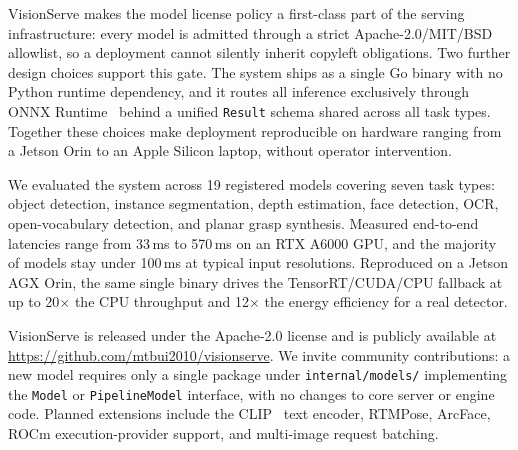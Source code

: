 VisionServe makes the model license policy a first-class part of the serving
infrastructure: every model is admitted through a strict Apache-2.0/MIT/BSD allowlist,
so a deployment cannot silently inherit copyleft obligations. Two further design choices
support this gate. The system ships as a single Go binary with no Python runtime
dependency, and it routes all inference exclusively through ONNX Runtime~\cite{onnxruntime}
behind a unified \texttt{Result} schema shared across all task types. Together these
choices make deployment reproducible on hardware ranging from a Jetson Orin to an
Apple Silicon laptop, without operator intervention.

We evaluated the system across 19 registered models covering seven task types:
object detection, instance segmentation, depth estimation, face detection, OCR,
open-vocabulary detection, and planar grasp synthesis. Measured end-to-end latencies
range from 33\,ms to 570\,ms on an RTX A6000 GPU, and the majority of models stay
under 100\,ms at typical input resolutions. Reproduced on a Jetson AGX Orin, the same
single binary drives the TensorRT/CUDA/CPU fallback at up to 20$\times$ the CPU throughput
and 12$\times$ the energy efficiency for a real detector.

VisionServe is released under the Apache-2.0 license and is publicly available at
\url{https://github.com/mtbui2010/visionserve}. We invite community contributions: a new
model requires only a single package under \texttt{internal/models/} implementing the
\texttt{Model} or \texttt{PipelineModel} interface, with no changes to core server or
engine code. Planned extensions include the CLIP~\cite{radford2021clip} text encoder,
RTMPose, ArcFace, ROCm execution-provider support, and multi-image request batching.

